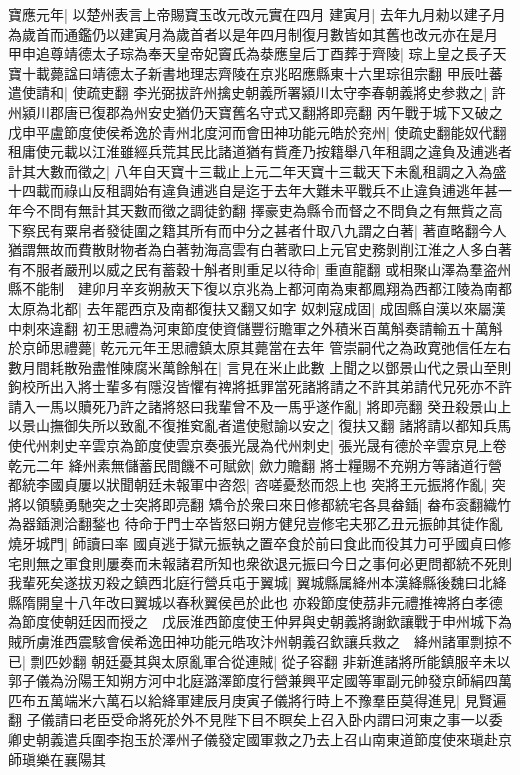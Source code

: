 寶應元年|{
	以楚州表言上帝賜寶玉改元改元實在四月}
建寅月|{
	去年九月勑以建子月為歲首而通鑑仍以建寅月為歲首者以是年四月制復月數皆如其舊也改元亦在是月}
甲申追尊靖德太子琮為奉天皇帝妃竇氏為㳟應皇后丁酉葬于齊陵|{
	琮上皇之長子天寶十載薨諡曰靖德太子新書地理志齊陵在京兆昭應縣東十六里琮徂宗翻}
甲辰吐蕃遣使請和|{
	使疏吏翻}
李光弼拔許州擒史朝義所署潁川太守李春朝義將史参救之|{
	許州潁川郡唐已復郡為州安史猶仍天寶舊名守式又翻將即亮翻}
丙午戰于城下又破之　戊申平盧節度使侯希逸於青州北度河而會田神功能元皓於兖州|{
	使疏史翻能奴代翻}
租庸使元載以江淮雖經兵荒其民比諸道猶有貲產乃按籍舉八年租調之違負及逋逃者計其大數而徵之|{
	八年自天寶十三載止上元二年天寶十三載天下未亂租調之入為盛十四載而祿山反租調始有違負逋逃自是迄于去年大難未平戰兵不止違負逋逃年甚一年今不問有無計其天數而徵之調徒釣翻}
擇豪吏為縣令而督之不問負之有無貲之高下察民有粟帛者發徒圍之籍其所有而中分之甚者什取八九謂之白著|{
	著直略翻今人猶謂無故而費散財物者為白著勃海高雲有白著歌曰上元官史務剝削江淮之人多白著}
有不服者嚴刑以威之民有蓄穀十斛者則重足以待命|{
	重直龍翻}
或相聚山澤為羣盗州縣不能制　建卯月辛亥朔赦天下復以京兆為上都河南為東都鳳翔為西都江陵為南都太原為北都|{
	去年罷西京及南都復扶又翻又如字}
奴刺寇成固|{
	成固縣自漢以來屬漢中刺來違翻}
初王思禮為河東節度使資儲豐衍贍軍之外積米百萬斛奏請輸五十萬斛於京師思禮薨|{
	乾元元年王思禮鎮太原其薨當在去年}
管崇嗣代之為政寛弛信任左右數月間耗散殆盡惟陳腐米萬餘斛在|{
	言見在米止此數}
上聞之以鄧景山代之景山至則鉤校所出入將士輩多有隱沒皆懼有禆將抵罪當死諸將請之不許其弟請代兄死亦不許請入一馬以贖死乃許之諸將怒曰我輩曾不及一馬乎遂作亂|{
	將即亮翻}
癸丑殺景山上以景山撫御失所以致亂不復推䆒亂者遣使慰諭以安之|{
	復扶又翻}
諸將請以都知兵馬使代州刺史辛雲京為節度使雲京奏張光晟為代州刺史|{
	張光晟有德於辛雲京見上卷乾元二年}
絳州素無儲蓄民間饑不可賦歛|{
	歛力贍翻}
將士糧賜不充朔方等諸道行營都統李國貞屢以狀聞朝廷未報軍中咨怨|{
	咨嗟憂愁而怨上也}
突將王元振將作亂|{
	突將以領驍勇馳突之士突將即亮翻}
矯令於衆曰來日修都統宅各具畚鍤|{
	畚布衮翻織竹為器鍤測洽翻鍫也}
待命于門士卒皆怒曰朔方健兒豈修宅夫邪乙丑元振帥其徒作亂燒牙城門|{
	師讀曰率}
國貞逃于獄元振執之置卒食於前曰食此而役其力可乎國貞曰修宅則無之軍食則屢奏而未報諸君所知也衆欲退元振曰今日之事何必更問都統不死則我輩死矣遂拔刃殺之鎮西北庭行營兵屯于翼城|{
	翼城縣属絳州本漢絳縣後魏曰北絳縣隋開皇十八年改曰翼城以春秋翼侯邑於此也}
亦殺節度使茘非元禮推禆將白孝德為節度使朝廷因而授之　戊辰淮西節度使王仲昇與史朝義將謝欽讓戰于申州城下為賊所虜淮西震駭會侯希逸田神功能元皓攻汴州朝義召欽讓兵救之　絳州諸軍剽掠不已|{
	剽匹妙翻}
朝廷憂其與太原亂軍合從連賊|{
	從子容翻}
非新進諸將所能鎮服辛未以郭子儀為汾陽王知朔方河中北庭潞澤節度行營兼興平定國等軍副元帥發京師絹四萬匹布五萬端米六萬石以給絳軍建辰月庚寅子儀將行時上不豫羣臣莫得進見|{
	見賢遍翻}
子儀請曰老臣受命將死於外不見陛下目不瞑矣上召入卧内謂曰河東之事一以委卿史朝義遣兵圍李抱玉於澤州子儀發定國軍救之乃去上召山南東道節度使來瑱赴京師瑱樂在襄陽其

